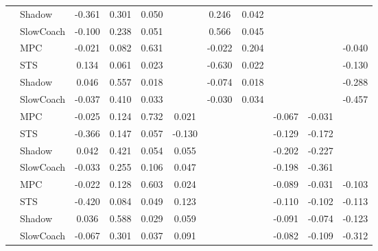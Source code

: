 \begin{tabular}{|l|l|*{9}{c|}}
                                                           & Shadow &   -0.361 &     0.301 &     0.050 &     &  0.246 &  0.042 &      &      &       \\
                                                           & SlowCoach &   -0.100 &     0.238 &     0.051 &     &  0.566 &  0.045 &      &      &       \\
\midrule
[True, True, True, False, True, True, False, False, True] & MPC &   -0.021 &     0.082 &     0.631 &     & -0.022 &  0.204 &      &      &   -0.040 \\
                                                           & STS &    0.134 &     0.061 &     0.023 &     & -0.630 &  0.022 &      &      &   -0.130 \\
                                                           & Shadow &    0.046 &     0.557 &     0.018 &     & -0.074 &  0.018 &      &      &   -0.288 \\
                                                           & SlowCoach &   -0.037 &     0.410 &     0.033 &     & -0.030 &  0.034 &      &      &   -0.457 \\
\midrule
[True, True, True, True, False, False, True, True, False] & MPC &   -0.025 &     0.124 &     0.732 &  0.021 &     &     &  -0.067 &  -0.031 &       \\
                                                           & STS &   -0.366 &     0.147 &     0.057 & -0.130 &     &     &  -0.129 &  -0.172 &       \\
                                                           & Shadow &    0.042 &     0.421 &     0.054 &  0.055 &     &     &  -0.202 &  -0.227 &       \\
                                                           & SlowCoach &   -0.033 &     0.255 &     0.106 &  0.047 &     &     &  -0.198 &  -0.361 &       \\
\midrule
[True, True, True, True, False, False, True, True, True] & MPC &   -0.022 &     0.128 &     0.603 &  0.024 &     &     &  -0.089 &  -0.031 &   -0.103 \\
                                                           & STS &   -0.420 &     0.084 &     0.049 &  0.123 &     &     &  -0.110 &  -0.102 &   -0.113 \\
                                                           & Shadow &    0.036 &     0.588 &     0.029 &  0.059 &     &     &  -0.091 &  -0.074 &   -0.123 \\
                                                           & SlowCoach &   -0.067 &     0.301 &     0.037 &  0.091 &     &     &  -0.082 &  -0.109 &   -0.312 \\

\end{tabular}
